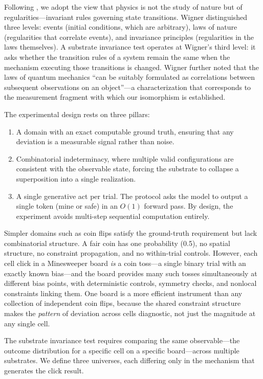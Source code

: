 \documentclass[12pt,a4paper]{article}
\begin{document}
Following \citet{wigner1963}, we adopt the view that physics is not the study of nature but of regularities---invariant rules governing state transitions. Wigner distinguished three levels: events (initial conditions, which are arbitrary), laws of nature (regularities that correlate events), and invariance principles (regularities in the laws themselves). A substrate invariance test operates at Wigner's third level: it asks whether the transition rules of a system remain the same when the mechanism executing those transitions is changed. Wigner further noted that the laws of quantum mechanics ``can be suitably formulated as correlations between subsequent observations on an object''---a characterization that corresponds to the measurement fragment with which our isomorphism is established.

The experimental design rests on three pillars:
\begin{enumerate}
    \item A domain with an exact computable ground truth, ensuring that any deviation is a measurable signal rather than noise.
    \item Combinatorial indeterminacy, where multiple valid configurations are consistent with the observable state, forcing the substrate to collapse a superposition into a single realization.
    \item A single generative act per trial. The protocol asks the model to output a single token (mine or safe) in an $O(1)$ forward pass. By design, the experiment avoids multi-step sequential computation entirely.
\end{enumerate}

Simpler domains such as coin flips satisfy the ground-truth requirement but lack combinatorial structure. A fair coin has one probability (0.5), no spatial structure, no constraint propagation, and no within-trial controls. However, each cell click in a Minesweeper board \emph{is} a coin toss---a single binary trial with an exactly known bias---and the board provides many such tosses simultaneously at different bias points, with deterministic controls, symmetry checks, and nonlocal constraints linking them. One board is a more efficient instrument than any collection of independent coin flips, because the shared constraint structure makes the \emph{pattern} of deviation across cells diagnostic, not just the magnitude at any single cell.

The substrate invariance test requires comparing the same observable---the outcome distribution for a specific cell on a specific board---across multiple substrates. We define three universes, each differing only in the mechanism that generates the click result.
\end{document}
